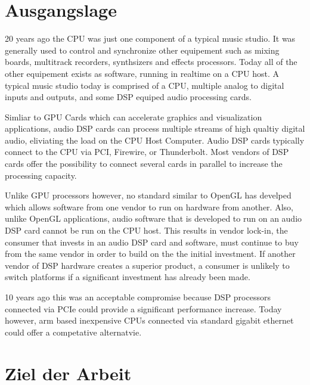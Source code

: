 \section{Ausgangslage}

20 years ago the CPU was just one component of a typical music studio. It was generally used to control and synchronize other equipement such as mixing boards, multitrack recorders, synthsizers and
effects processors. Today all of the other equipement exists as software, running in realtime on a CPU host. A typical music studio today is comprised of a CPU, multiple analog to digital inputs and outputs, and some DSP equiped audio processing cards. 

Simliar to GPU Cards which can accelerate graphics and visualization applications, audio DSP cards can process multiple streams of high qualtiy digital audio, eliviating the load on the CPU Host Computer. Audio DSP cards typically connect to the CPU via PCI, Firewire, or Thunderbolt. Most vendors of DSP cards offer the possibility to connect several cards in parallel to increase the processing capacity.

Unlike GPU processors however, no standard similar to OpenGL has develped which allows software from one vendor to run on hardware from another. Also, unlike OpenGL applications, audio software that is developed to run on an audio DSP card cannot be run on the CPU host. This results in vendor lock-in,
the consumer that invests in an audio DSP card and software, must continue to buy from the same vendor in order to build on the the initial investment. If another vendor of DSP hardware creates a superior product, a consumer is unlikely to switch platforms if a significant investment has already been made.  

10 years ago this was an acceptable compromise because DSP processors connected via PCIe could provide a significant performance increase. Today however, arm based inexpensive CPUs connected via standard gigabit ethernet could offer a competative alternatvie. 

\section{Ziel der Arbeit}


